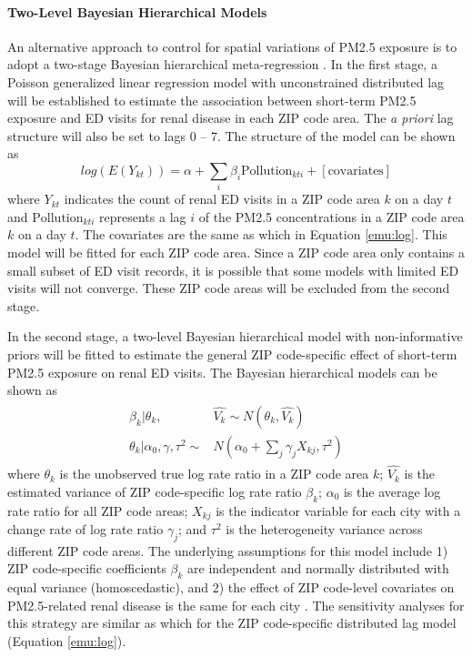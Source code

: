 \documentclass[11pt]{article}
\begin{document}
\paragraph{Two-Level Bayesian Hierarchical Models}
An alternative approach to control for spatial variations of PM2.5 exposure is to adopt a two-stage Bayesian hierarchical meta-regression \citep{OLenick2017}. In the first stage, a Poisson generalized linear regression model with unconstrained distributed lag will be established to estimate the association between short-term PM2.5 exposure and ED visits for renal disease in each ZIP code area. The \textit{a priori} lag structure will also be set to lags 0 -- 7. The structure of the model can be shown as
\begin{equation}
\label{emu:logsimple}
log(E(Y_{kt}))=\alpha+\sum_i\beta_i\mathrm{Pollution}_{kti}+[\mathrm{covariates}]
\end{equation}
where $Y_{kt}$ indicates the count of renal ED visits in a ZIP code area $k$ on a day $t$ and $\mathrm{Pollution}_{kti}$ represents a lag $i$ of the PM2.5 concentrations in a ZIP code area $k$ on a day $t$. The covariates are the same as which in Equation \ref{emu:log}. This model will be fitted for each ZIP code area. Since a ZIP code area only contains a small subset of ED visit records, it is possible that some models with limited ED visits will not converge. These ZIP code areas will be excluded from the second stage. 

In the second stage, a two-level Bayesian hierarchical model with non-informative priors will be fitted to estimate the general ZIP code-specific effect of short-term PM2.5 exposure on renal ED visits. The Bayesian hierarchical models can be shown as
\begin{align}
\begin{split}
\beta_k|\theta_k, &\hat{V_k}\sim N(\theta_k, \hat{V_k}) \\
\theta_k|\alpha_0,\gamma,\tau^2\sim &N(\alpha_0+\sum_j\gamma_jX_{kj},\tau^2)
\end{split}
\end{align}
where $\theta_k$ is the unobserved true log rate ratio in a ZIP code area $k$; $\hat{V_k}$ is the estimated variance of ZIP code-specific log rate ratio $\beta_k$; $\alpha_0$ is the average log rate ratio for all ZIP code areas; $X_{kj}$ is the indicator variable for each city with a change rate of log rate ratio $\gamma_j$; and $\tau^2$ is the heterogeneity variance across different ZIP code areas. The underlying assumptions for this model include 1) ZIP code-specific coefficients $\beta_k$ are independent and normally distributed with equal variance (homoscedastic), and 2) the effect of ZIP code-level covariates on PM2.5-related renal disease is the same for each city \citep{OLenick2017}. The sensitivity analyses for this strategy are similar as which for the ZIP code-specific distributed lag model (Equation \ref{emu:log}). 
\end{document}

